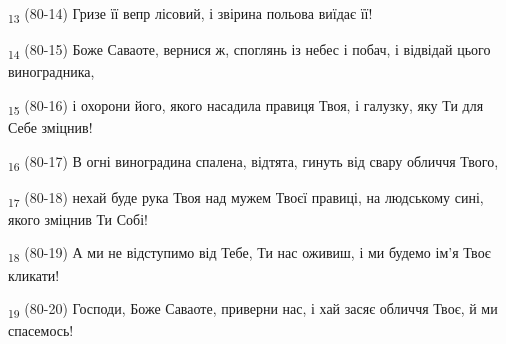 \begin{tcolorbox}
\textsubscript{13} (80-14) Гризе її вепр лісовий, і звірина польова виїдає її!
\end{tcolorbox}
\begin{tcolorbox}
\textsubscript{14} (80-15) Боже Саваоте, вернися ж, споглянь із небес і побач, і відвідай цього виноградника,
\end{tcolorbox}
\begin{tcolorbox}
\textsubscript{15} (80-16) і охорони його, якого насадила правиця Твоя, і галузку, яку Ти для Себе зміцнив!
\end{tcolorbox}
\begin{tcolorbox}
\textsubscript{16} (80-17) В огні виноградина спалена, відтята, гинуть від свару обличчя Твого,
\end{tcolorbox}
\begin{tcolorbox}
\textsubscript{17} (80-18) нехай буде рука Твоя над мужем Твоєї правиці, на людському сині, якого зміцнив Ти Собі!
\end{tcolorbox}
\begin{tcolorbox}
\textsubscript{18} (80-19) А ми не відступимо від Тебе, Ти нас оживиш, і ми будемо ім'я Твоє кликати!
\end{tcolorbox}
\begin{tcolorbox}
\textsubscript{19} (80-20) Господи, Боже Саваоте, приверни нас, і хай засяє обличчя Твоє, й ми спасемось!
\end{tcolorbox}
